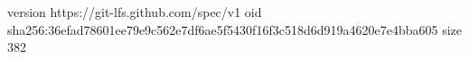 version https://git-lfs.github.com/spec/v1
oid sha256:36efad78601ee79e9c562e7df6ae5f5430f16f3c518d6d919a4620e7e4bba605
size 382
